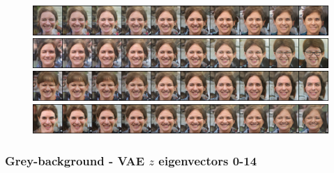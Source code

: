 \documentclass{article}
\begin{document}
\begin{figure}[H]
  \includegraphics[width=0.9\linewidth]{eigen/raw_gan_26.png}
  \includegraphics[width=0.9\linewidth]{eigen/raw_gan_27.png}
  \includegraphics[width=0.9\linewidth]{eigen/raw_gan_28.png}
  \includegraphics[width=0.9\linewidth]{eigen/raw_gan_29.png}

\end{figure}
\newpage


\subsubsection*{Grey-background - VAE $z$ eigenvectors 0-14}
\end{document}
